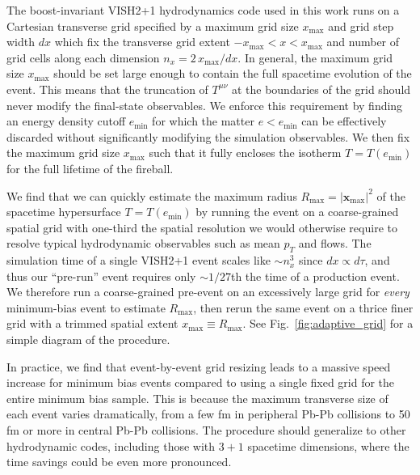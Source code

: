 \documentclass[aps,prc,reprint,amsmath,nofootinbib]{revtex4-1}
\newcommand{\x}{\mathbf{x}}
\begin{document}
The boost-invariant \textsc{VISH2+1} hydrodynamics code used in this work \cite{Song:2007ux, Shen:2014vra} runs on a Cartesian transverse grid specified by a maximum grid size $x_\text{max}$ and grid step width $dx$ which fix the transverse grid extent ${-x_\text{max} < x < x_\text{max}}$ and number of grid cells along each dimension ${n_x = 2\, x_\text{max} / dx}$.
In general, the maximum grid size $x_\text{max}$ should be set large enough to contain the full spacetime evolution of the event.
This means that the truncation of $T^{\mu\nu}$ at the boundaries of the grid should never modify the final-state observables.
We enforce this requirement by finding an energy density cutoff $e_\text{min}$ for which the matter $e < e_\text{min}$ can be effectively discarded without significantly modifying the simulation observables.
We then fix the maximum grid size $x_\text{max}$ such that it fully encloses the isotherm $T=T(e_\text{min})$ for the full lifetime of the fireball.

We find that we can quickly estimate the maximum radius $R_\text{max} = |\x_\text{max}|^2$ of the spacetime hypersurface ${T = T(e_\text{min})}$ by running the event on a coarse-grained spatial grid with one-third the spatial resolution we would otherwise require to resolve typical hydrodynamic observables such as mean $p_T$ and flows.
The simulation time of a single \textsc{VISH2+1} event scales like ${\sim}n_x^3$ since $dx \propto d\tau$, and thus our ``pre-run'' event requires only ${\sim}1/27$th the time of a production event.
We therefore run a coarse-grained pre-event on an excessively large grid for \emph{every} minimum-bias event to estimate $R_\text{max}$, then rerun the same event on a thrice finer grid with a trimmed spatial extent $x_\text{max} \equiv R_\text{max}$.
See Fig.~\ref{fig:adaptive_grid} for a simple diagram of the procedure.

In practice, we find that event-by-event grid resizing leads to a massive speed increase for minimum bias events compared to using a single fixed grid for the entire minimum bias sample.
This is because the maximum transverse size of each event varies dramatically, from a few fm in peripheral Pb-Pb collisions to 50 fm or more in central Pb-Pb collisions.
The procedure should generalize to other hydrodynamic codes, including those with $3+1$ spacetime dimensions, where the time savings could be even more pronounced.
\end{document}
